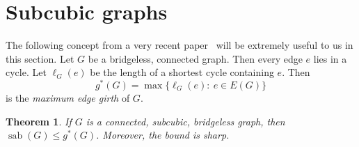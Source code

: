 \documentclass[12pt]{article}
\newtheorem{theorem}{Theorem}[section]
\DeclareMathOperator{\sab}{\mathrm{sab}}
\begin{document}
\section{Subcubic graphs}
\label{sec:subcubic}

The following concept from a very recent paper~\cite{lin-2026} will be extremely useful to us in this section. Let $G$ be a bridgeless, connected graph. Then every edge $e$ lies in a cycle. Let $\ell_G(e)$ be the length of a shortest cycle containing $e$. Then 
$$g^\ast(G) = \max \{ \ell_G(e):\ e\in E(G)\}$$
is the {\em maximum edge girth} of $G$.

\begin{theorem}
\label{thm:subcubic}
If $G$ is a connected, subcubic, bridgeless graph, then $\sab(G) \le g^\ast(G)$. Moreover, the bound is sharp.
\end{theorem}
\end{document}
